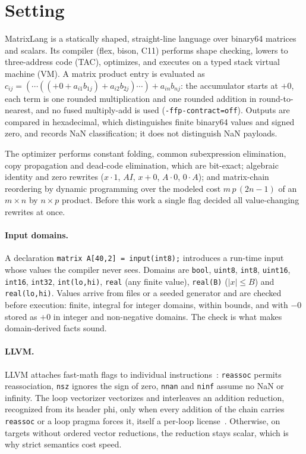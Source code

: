 \documentclass[acmsmall,review,anonymous,nonacm]{acmart}
\newcommand{\abs}[1]{\lvert #1\rvert}
\begin{document}
\section{Setting}\label{sec:setting}
MatrixLang is a statically shaped, straight-line language over binary64
matrices and scalars. Its compiler (flex, bison, C11) performs shape checking,
lowers to three-address code (TAC), optimizes, and executes on a typed stack
virtual machine (VM). A matrix product entry is evaluated as
$c_{ij} = (\cdots((+0 + a_{i1}b_{1j}) + a_{i2}b_{2j}) \cdots) + a_{in}b_{nj}$:
the accumulator starts at $+0$, each term is one rounded multiplication and one
rounded addition in round-to-nearest, and no fused multiply-add is used
(\texttt{-ffp-contract=off}). Outputs are compared in hexadecimal, which
distinguishes finite binary64 values and signed zero, and records NaN
classification; it does not distinguish NaN payloads.

The optimizer performs constant folding, common subexpression elimination, copy
propagation and dead-code elimination, which are bit-exact; algebraic identity
and zero rewrites ($x\cdot1$, $AI$, $x+0$, $A\cdot0$, $0\cdot A$); and matrix-chain
reordering by dynamic programming over the modeled cost $m\,p\,(2n-1)$ of an
$m\times n$ by $n\times p$ product. Before this work a single flag decided all
value-changing rewrites at once.

\paragraph{Input domains.} A declaration
\texttt{matrix A[40,2] = input(int8);} introduces a run-time input whose
values the compiler never sees. Domains are \texttt{bool}, \texttt{uint8},
\texttt{int8}, \texttt{uint16}, \texttt{int16}, \texttt{int32},
\texttt{int(lo,hi)}, \texttt{real} (any finite value), \texttt{real(B)}
($\abs{x}\le B$) and \texttt{real(lo,hi)}. Values arrive from files or a seeded
generator and are checked before execution: finite, integral for integer
domains, within bounds, and with $-0$ stored as $+0$ in integer and non-negative
domains. The check is what makes domain-derived facts sound.

\paragraph{LLVM\@.} LLVM attaches fast-math flags to individual
instructions~\cite{llvm-fmf}: \texttt{reassoc} permits reassociation,
\texttt{nsz} ignores the sign of zero, \texttt{nnan} and \texttt{ninf} assume
no NaN or infinity. The loop vectorizer vectorizes and interleaves an addition
reduction, recognized from its header phi, only when every addition of the
chain carries \texttt{reassoc} or a loop pragma forces it, itself a per-loop
license~\cite{llvm-vectorizers}. Otherwise, on targets without ordered vector
reductions, the reduction stays scalar, which is why strict semantics cost speed.
\end{document}

